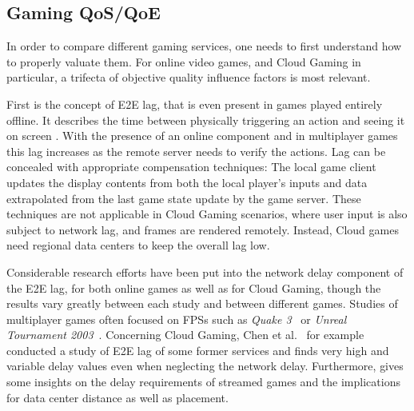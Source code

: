 

\subsection{Gaming QoS/QoE}

In order to compare different gaming services, one needs to first understand how to properly valuate them. For online video games, and Cloud Gaming in particular, a trifecta of objective quality influence factors is most relevant.

First is the concept of \gls{E2E} lag, that is even present in games played entirely offline. It describes the time between physically triggering an action and seeing it on screen \cite{metzger16lagmodel}. With the presence of an online component and in multiplayer games this lag increases as the remote server needs to verify the actions. Lag can be concealed with appropriate compensation techniques: The local game client updates the display contents from both the local player's inputs and data extrapolated from the last game state update by the game server. These techniques are not applicable in Cloud Gaming scenarios, where user input is also subject to network lag, and frames are rendered remotely. Instead, Cloud games need regional data centers to keep the overall lag low.

Considerable research efforts have been put into the network delay component of the \gls{E2E} lag, for both online games as well as for Cloud Gaming, though the results vary greatly between each study and between different games. Studies of multiplayer games often focused on \glspl{FPS} such as \textit{Quake 3}~\cite{1266180} or \textit{Unreal Tournament 2003}~\cite{Beigbeder:2004:ELL:1016540.1016556}. Concerning Cloud Gaming, Chen et al.~\cite{6670099} for example conducted a study of \gls{E2E} lag of some former services and finds very high and variable delay values even when neglecting the network delay.
Furthermore, \cite{Choy:2012:BSC:2501560.2501563} gives some insights on the delay requirements of streamed games and the implications for data center distance as well as placement.

